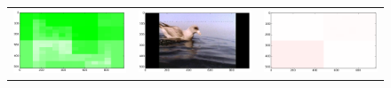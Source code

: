 \begin{figure}
\begin{tabular}{ccc}
\includegraphics[keepaspectratio=true,width=\segwidth]{images/segment/401_10__animals__.png} &
\includegraphics[keepaspectratio=true,width=\segwidth]{images/segment/401_10__image__.png} &
\includegraphics[keepaspectratio=true,width=\segwidth]{images/segment/401_10__plastic__.png} \\


\end{tabular}
\end{figure}
